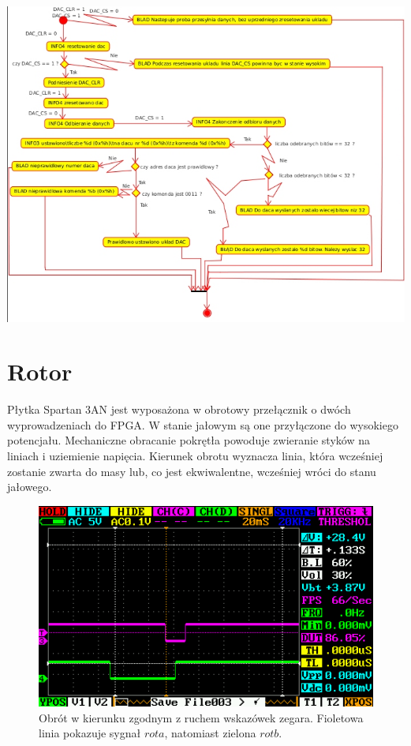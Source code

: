 \documentclass[a4paper,12pt]{article}
\begin{document}
\includegraphics[width=15cm]{grafika/dac-uml.jpg}


\newpage
\section{Rotor}

Płytka Spartan 3AN jest wyposażona w obrotowy przełącznik o dwóch wyprowadzeniach do FPGA. W stanie jałowym są one przyłączone do wysokiego potencjału. Mechaniczne obracanie pokrętła powoduje zwieranie styków na liniach i uziemienie napięcia. Kierunek obrotu wyznacza linia, która wcześniej zostanie zwarta do masy lub, co jest ekwiwalentne, wcześniej wróci do stanu jałowego.

\begin{figure}[htb]
   \centering
   \includegraphics[width=13cm]{grafika/dso/rotor-w-prawo-jeden.png}
   \caption{Obrót w kierunku zgodnym z ruchem wskazówek zegara. Fioletowa linia pokazuje sygnał $rota$, natomiast zielona $rotb$.}
\end{figure}
\end{document}
